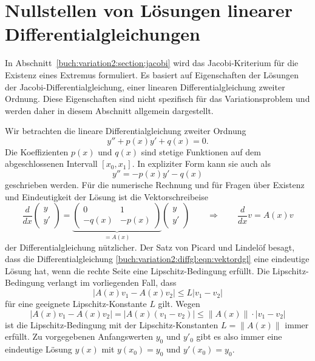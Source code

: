 %
%
%
\section{Nullstellen von Lösungen linearer Differentialgleichungen
\label{buch:variation2:section:diffgl}}
In Abschnitt~\ref{buch:variation2:section:jacobi} wird das
Jacobi-Kriterium für die Existenz eines Extremus formuliert.
Es basiert auf Eigenschaften der Lösungen der Jacobi-Differentialgleichung,
einer linearen Differentialgleichung zweiter Ordnung.
Diese Eigenschaften sind nicht spezifisch für das Variationsproblem
und werden daher in diesem Abschnitt allgemein dargestellt.

Wir betrachten die lineare Differentialgleichung zweiter Ordnung
\begin{equation}
y'' + p(x) y' + q(x) = 0.
\label{buch:variation2:diffgl:eqn:dgl}
\end{equation}
Die Koeffizienten $p(x)$ und $q(x)$ sind stetige Funktionen auf dem
abgeschlossenen Intervall $[x_0,x_1]$.
In expliziter Form kann sie auch als
\begin{equation}
y'' = - p(x) y' - q(x)
\label{buch:variation2:diffgl:eqn:explizit}
\end{equation}
geschrieben werden.
Für die numerische Rechnung und für Fragen über Existenz und Eindeutigkeit
der Lösung ist die Vektorschreibeise
\begin{equation}
\frac{d}{dx}
\begin{pmatrix} y\\ y' \end{pmatrix}
=
\underbrace{
\begin{pmatrix}
    0&    1\\
-q(x)&-p(x)
\end{pmatrix}
}_{\displaystyle =A(x)}
\begin{pmatrix} y\\ y' \end{pmatrix}
\qquad\Rightarrow\qquad
\frac{d}{dx}v = A(x) v
\label{buch:variation2:diffgl:eqn:vektordgl}
\end{equation}
der Differentialgleichung nützlicher.
Der Satz von Picard und Lindelöf besagt, dass die Differentialgleichung
\eqref{buch:variation2:diffgl:eqn:vektordgl} eine eindeutige
Lösung hat, wenn die rechte Seite eine Lipschitz-Bedingung
erfüllt.
Die Lipschitz-Bedingung verlangt im vorliegenden Fall, dass
\[
|A(x)v_1 - A(x)v_2|
\le
L |v_1-v_2|
\]
für eine geeignete Lipschitz-Konstante $L$ gilt.
Wegen
\[
|A(x)v_1-A(x)v_2|
=
|A(x)(v_1-v_2)|
\le
\|A(x)\|\cdot |v_1-v_2|
\]
ist die Lipschitz-Bedingung mit der Lipschitz-Konstanten
$L=\|A(x)\|$ immer erfüllt.
Zu vorgegebenen Anfangswerten $y_0$ und $y'_0$ gibt es also
immer eine eindeutige Lösung $y(x)$ mit $y(x_0)=y_0$ und
$y'(x_0)=y_0$.

